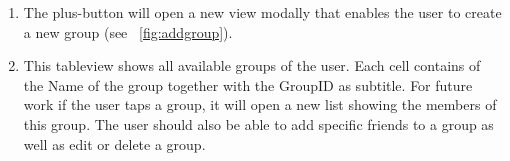 \begin{enumerate}
 \item The plus-button will open a new view modally that enables the user to create a new group (see ~\ref{fig:addgroup}).
 \item This tableview shows all available groups of the user. Each cell contains of the Name of the group together with the GroupID as subtitle. For future work if the user taps a group, it will open a new list showing the members of this group. The user should also be able to add specific friends to a group as well as edit or delete a group.
\end{enumerate} 
